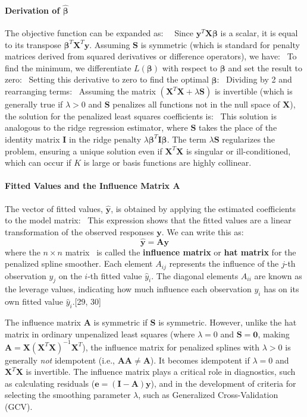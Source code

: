 \documentclass[11pt, a4paper]{article}
\begin{document}
\begin{itemize}
\paragraph{Derivation of $\hat{\boldsymbol{\beta}}$}
The objective function can be expanded as:
\
\
Since $\mathbf{y}^T\mathbf{X}\boldsymbol{\beta}$ is a scalar, it is equal to its transpose $\boldsymbol{\beta}^T\mathbf{X}^T\mathbf{y}$. Assuming $\mathbf{S}$ is symmetric (which is standard for penalty matrices derived from squared derivatives or difference operators), we have:
\
To find the minimum, we differentiate $L(\boldsymbol{\beta})$ with respect to $\boldsymbol{\beta}$ and set the result to zero:
\
Setting this derivative to zero to find the optimal $\hat{\boldsymbol{\beta}}$:
\
Dividing by 2 and rearranging terms:
\
Assuming the matrix $(\mathbf{X}^T\mathbf{X} + \lambda\mathbf{S})$ is invertible (which is generally true if $\lambda > 0$ and $\mathbf{S}$ penalizes all functions not in the null space of $\mathbf{X}$), the solution for the penalized least squares coefficients is:
\
This solution is analogous to the ridge regression estimator, where $\mathbf{S}$ takes the place of the identity matrix $\mathbf{I}$ in the ridge penalty $\lambda \boldsymbol{\beta}^T\mathbf{I}\boldsymbol{\beta}$. The term $\lambda\mathbf{S}$ regularizes the problem, ensuring a unique solution even if $\mathbf{X}^T\mathbf{X}$ is singular or ill-conditioned, which can occur if $K$ is large or basis functions are highly collinear.

\paragraph{Fitted Values and the Influence Matrix $\mathbf{A}$}
The vector of fitted values, $\hat{\mathbf{y}}$, is obtained by applying the estimated coefficients to the model matrix:
\
This expression shows that the fitted values are a linear transformation of the observed responses $\mathbf{y}$. We can write this as:
\[ \hat{\mathbf{y}} = \mathbf{A}\mathbf{y} \]
where the $n \times n$ matrix
\
is called the \textbf{influence matrix} or \textbf{hat matrix} for the penalized spline smoother. Each element $A_{ij}$ represents the influence of the $j$-th observation $y_j$ on the $i$-th fitted value $\hat{y}_i$. The diagonal elements $A_{ii}$ are known as the leverage values, indicating how much influence each observation $y_i$ has on its own fitted value $\hat{y}_i$.[29, 30]

The influence matrix $\mathbf{A}$ is symmetric if $\mathbf{S}$ is symmetric. However, unlike the hat matrix in ordinary unpenalized least squares (where $\lambda=0$ and $\mathbf{S}=\mathbf{0}$, making $\mathbf{A} = \mathbf{X}(\mathbf{X}^T\mathbf{X})^{-1}\mathbf{X}^T$), the influence matrix for penalized splines with $\lambda > 0$ is generally \textit{not} idempotent (i.e., $\mathbf{A}\mathbf{A} \neq \mathbf{A}$). It becomes idempotent if $\lambda=0$ and $\mathbf{X}^T\mathbf{X}$ is invertible. The influence matrix plays a critical role in diagnostics, such as calculating residuals ($\mathbf{e} = (\mathbf{I}-\mathbf{A})\mathbf{y}$), and in the development of criteria for selecting the smoothing parameter $\lambda$, such as Generalized Cross-Validation (GCV).


\end{itemize}
\end{document}
